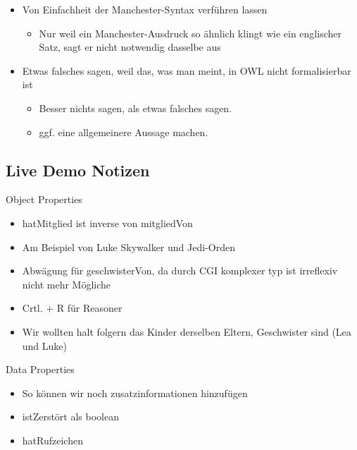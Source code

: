 \documentclass[a4paper]{article}
\begin{document}
\begin{itemize}
    \item Von Einfachheit der Manchester-Syntax verführen lassen
    \begin{itemize}
        \item Nur weil ein Manchester-Ausdruck so ähnlich klingt wie ein englischer Satz, sagt er nicht notwendig dasselbe aus
    \end{itemize}
    \item Etwas falsches sagen, weil das, was man meint, in OWL nicht formalisierbar ist
    \begin{itemize}
        \item Besser nichts sagen, als etwas falsches sagen.
        \item ggf. eine allgemeinere Aussage machen.
    \end{itemize}
\end{itemize}

\subsection{Live Demo Notizen}

Object Properties

\begin{itemize}
    \item hatMitglied ist inverse von mitgliedVon
    \item Am Beispiel von Luke Skywalker und Jedi-Orden
    \item Abwägung für geschwisterVon, da durch CGI komplexer typ ist irreflexiv nicht mehr Mögliche
    \item Crtl. + R für Reasoner
    \item Wir wollten halt folgern das Kinder derselben Eltern, Geschwister sind (Lea und Luke)
\end{itemize}

Data Properties

\begin{itemize}
    \item So können wir noch zusatzinformationen hinzufügen
    \item istZerstört als boolean
    \item hatRufzeichen
\end{itemize}
\end{document}
